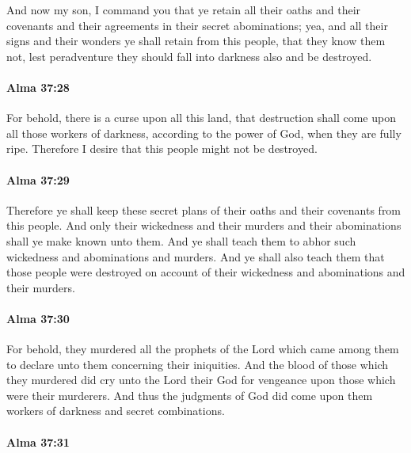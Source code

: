 			And now my son, I command you
			that ye retain all their oaths and their covenants
			and their agreements in their secret abominations;
			yea, and all their signs and their wonders ye shall retain from this people,
			that they know them not,
			lest peradventure they should fall into darkness also and be destroyed.

		\paragraph{Alma 37:28} %
			\label{ALMA-37-28}

			For behold, there is a curse upon all this land,
			that destruction shall come upon all those workers of darkness,
			according to the power of God,
			when they are fully ripe.
			Therefore I desire that this people might not be destroyed.

		\paragraph{Alma 37:29} %
			\label{ALMA-37-29}

			Therefore ye shall keep
			these secret plans of their oaths and their covenants
			from this people.
			And only their wickedness and their murders and their abominations
			shall ye make known unto them.
			And ye shall teach them to abhor such wickedness and abominations and murders.
			And ye shall also teach them that those people were destroyed
			on account of their wickedness and abominations and their murders.

		\paragraph{Alma 37:30} %
			\label{ALMA-37-30}

			For behold, they murdered all the prophets of the Lord
			which came among them to declare unto them concerning their iniquities.
			And the blood of those which they murdered did cry unto the Lord their God
			for vengeance upon those which were their murderers.
			And thus the judgments of God did come
			upon them workers of darkness and secret combinations.

		\paragraph{Alma 37:31} %
			\label{ALMA-37-31}

